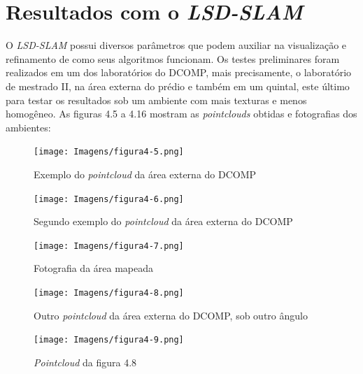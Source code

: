 \section{Resultados com o \textit{LSD-SLAM}}

O \textit{LSD-SLAM} possui diversos parâmetros que podem auxiliar na visualização e refinamento de como seus algoritmos funcionam. Os testes preliminares foram realizados em um dos laboratórios do DCOMP, mais precisamente, o laboratório de mestrado II, na área externa do prédio e também em um quintal, este último para testar os resultados sob um ambiente com mais texturas e menos homogêneo. As figuras 4.5 a 4.16 mostram as \textit{pointclouds} obtidas e fotografias dos ambientes:

\begin{figure}[!htb]
	\centering
		\texttt{[image: Imagens/figura4-5.png]}
	\caption{Exemplo do \textit{pointcloud} da área externa do DCOMP}
	\label{fig4:5}
\end{figure}

\begin{figure}[!htb]
	\centering
		\texttt{[image: Imagens/figura4-6.png]}
	\caption{Segundo exemplo do \textit{pointcloud} da área externa do DCOMP}
	\label{fig4:6}
\end{figure}

\begin{figure}[!htb]
	\centering
		\texttt{[image: Imagens/figura4-7.png]}
	\caption{Fotografia da área mapeada}
	\label{fig4:7}
\end{figure}

\begin{figure}[!htb]
	\centering
		\texttt{[image: Imagens/figura4-8.png]}
	\caption{Outro \textit{pointcloud} da área externa do DCOMP, sob outro ângulo}
	\label{fig4:8}
\end{figure}

\begin{figure}[!htb]
	\centering
		\texttt{[image: Imagens/figura4-9.png]}
	\caption{\textit{Pointcloud} da figura 4.8}
	\label{fig4:9}
\end{figure}

